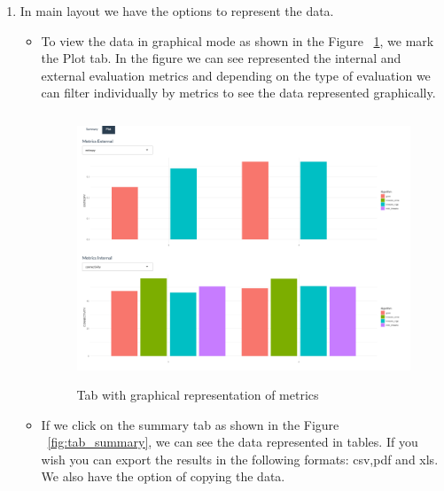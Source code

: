 \begin{enumerate}
\begin{itemize}
Note: The variables in the data set can be translated into whole numbers. As we have worked with the basketball dataset throughout the paper, the dataset contains the following variables: \texttt{assists\_per\_minute, height, time\_played, age, points\_per\_minute}. These variables are translated into whole numbers from left to right, i.e. \texttt{assists\_per\_minute} corresponds to 1, \texttt{height} to 2 and so on. This is ideal, when instead of showing the numerical values of the metrics we need to see the variables of the set.
\end{itemize}
  \item In main layout we have the options to represent the data.
  \begin{itemize}

    \item To view the data in graphical mode as shown in the Figure ~\ref{fig:tab_graph}, we mark the Plot tab. In the figure we can see represented the internal and external evaluation metrics and depending on the type of evaluation we can filter individually by metrics to see the data represented graphically.

  \begin{figure}[htbp]
    \centering
     \includegraphics[width=14cm, height=8cm]{img/tab_graph}
      \caption{Tab with graphical representation of metrics}
      \label{fig:tab_graph}
  \end{figure}

    \item If we click on the summary tab as shown in the Figure ~\ref{fig:tab_summary}, we can see the data represented in tables. If you wish you can export the results in the following formats: csv,pdf and xls. We also have the option of copying the data.


\end{itemize}
\end{enumerate}
